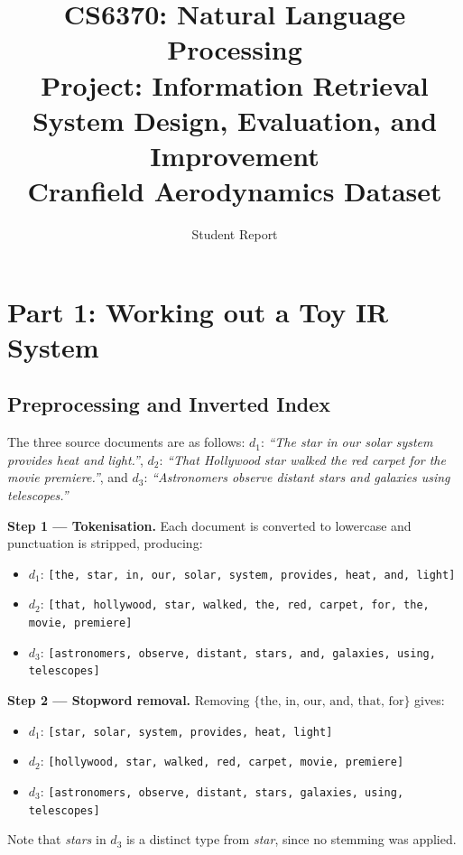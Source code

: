 \documentclass{article}
\title{
    \vspace{-1cm}
    \textbf{CS6370: Natural Language Processing}\\[0.3em]
    \large Project: Information Retrieval System Design, Evaluation, and Improvement\\[0.3em]
    \normalsize Cranfield Aerodynamics Dataset
}
\author{Student Report}
\date{}
\begin{document}
\maketitle
\thispagestyle{fancy}

\tableofcontents
\newpage

\section{Part 1: Working out a Toy IR System}

\subsection{Preprocessing and Inverted Index}

The three source documents are as follows: $d_1$: \textit{``The star in our solar system provides heat and light.''}, $d_2$: \textit{``That Hollywood star walked the red carpet for the movie premiere.''}, and $d_3$: \textit{``Astronomers observe distant stars and galaxies using telescopes.''}

\textbf{Step 1 — Tokenisation.} Each document is converted to lowercase and punctuation is stripped, producing:
\begin{itemize}[noitemsep]
    \item $d_1$: \texttt{[the, star, in, our, solar, system, provides, heat, and, light]}
    \item $d_2$: \texttt{[that, hollywood, star, walked, the, red, carpet, for, the, movie, premiere]}
    \item $d_3$: \texttt{[astronomers, observe, distant, stars, and, galaxies, using, telescopes]}
\end{itemize}

\textbf{Step 2 — Stopword removal.} Removing $\{\text{the, in, our, and, that, for}\}$ gives:
\begin{itemize}[noitemsep]
    \item $d_1$: \texttt{[star, solar, system, provides, heat, light]}
    \item $d_2$: \texttt{[hollywood, star, walked, red, carpet, movie, premiere]}
    \item $d_3$: \texttt{[astronomers, observe, distant, stars, galaxies, using, telescopes]}
\end{itemize}
Note that \textit{stars} in $d_3$ is a distinct type from \textit{star}, since no stemming was applied.
\end{document}

